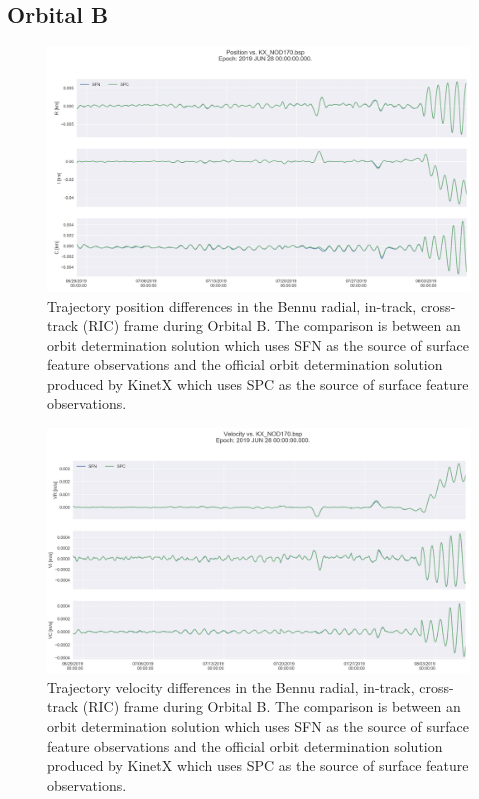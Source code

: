 \documentclass{RPI-SIW}
\begin{document}
\subsection*{Orbital B}
\begin{figure}[h]
	\centering
	\includegraphics[width=\columnwidth]{orbitb_pfig.png}
    \caption{Trajectory position differences in the Bennu radial, in-track, cross-track (RIC) frame during Orbital B.  The comparison is between an orbit determination solution which uses SFN as the source of surface feature observations and the official orbit determination solution produced by KinetX which uses SPC as the source of surface feature observations.}
    \label{fig:obpos}
\end{figure}
\begin{figure}[h]
	\centering
	\includegraphics[width=\columnwidth]{orbitb_vfig.png}
    \caption{Trajectory velocity differences in the Bennu radial, in-track, cross-track (RIC) frame during Orbital B.  The comparison is between an orbit determination solution which uses SFN as the source of surface feature observations and the official orbit determination solution produced by KinetX which uses SPC as the source of surface feature observations.}
    \label{fig:obvel}
\end{figure}
\end{document}
